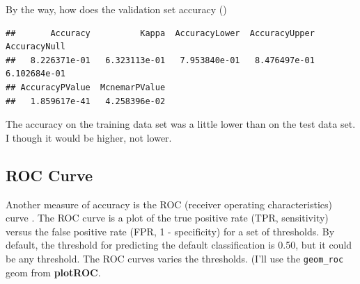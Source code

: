 \documentclass[
]{book}
\newenvironment{Shaded}{\begin{snugshade}}{\end{snugshade}}
\newcommand{\DataTypeTok}[1]{\textcolor[rgb]{0.13,0.29,0.53}{#1}}
\newcommand{\KeywordTok}[1]{\textcolor[rgb]{0.13,0.29,0.53}{\textbf{#1}}}
\newcommand{\NormalTok}[1]{#1}
\newcommand{\OperatorTok}[1]{\textcolor[rgb]{0.81,0.36,0.00}{\textbf{#1}}}
\newcommand{\StringTok}[1]{\textcolor[rgb]{0.31,0.60,0.02}{#1}}
\begin{document}
By the way, how does the validation set accuracy ()

\begin{Shaded}
\end{Shaded}

\begin{verbatim}
##       Accuracy          Kappa  AccuracyLower  AccuracyUpper   AccuracyNull 
##   8.226371e-01   6.323113e-01   7.953840e-01   8.476497e-01   6.102684e-01 
## AccuracyPValue  McnemarPValue 
##   1.859617e-41   4.258396e-02
\end{verbatim}

The accuracy on the training data set was a little lower than on the test data set. I though it would be higher, not lower.

\hypertarget{roc-curve}{%
\subsection{ROC Curve}\label{roc-curve}}

Another measure of accuracy is the ROC (receiver operating characteristics) curve \citep{Fawcett2005}. The ROC curve is a plot of the true positive rate (TPR, sensitivity) versus the false positive rate (FPR, 1 - specificity) for a set of thresholds. By default, the threshold for predicting the default classification is 0.50, but it could be any threshold. The ROC curves varies the thresholds. (I'll use the \texttt{geom\_roc} geom from \textbf{plotROC}.
\end{document}
